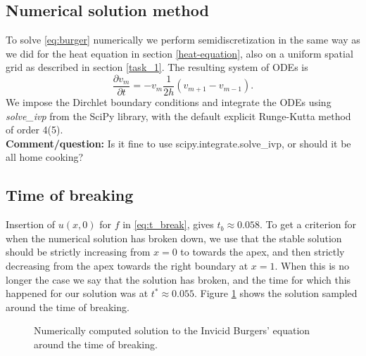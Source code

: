 \subsection*{Numerical solution method}
To solve \eqref{eq:burger} numerically we perform semidiscretization in the same way as we did for the heat equation in section \ref{heat-equation}, 
also on a uniform spatial grid as described in section \ref{task_1}. 
The resulting system of ODEs is
\begin{equation*}
    \frac{\partial v_m}{\partial t} = -v_m \frac{1}{2h} (v_{m+1} - v_{m-1}). 
\end{equation*}
We impose the Dirchlet boundary conditions and integrate the ODEs using \textit{solve\_ivp} from the SciPy library, 
with the default explicit Runge-Kutta method of order 4(5)\cite{solve_ivp}. \\
\textbf{Comment/question:} Is it fine to use scipy.integrate.solve\_ivp, 
or should it be all home cooking? 

\subsection{Time of breaking}
Insertion of $u(x, 0)$ for $f$ in \eqref{eq:t_break}, 
gives $t_b \approx 0.058$. 
To get a criterion for when the numerical solution has broken down, 
we use that the stable solution should be strictly increasing from $x=0$ to towards the apex, 
and then strictly decreasing from the apex towards the right boundary at $x=1$. 
When this is no longer the case we say that the solution has broken, 
and the time for which this happened for our solution was at $t^* \approx 0.055$. 
Figure \ref{fig:burgers-samples} shows the solution sampled around the time of breaking. 

\begin{figure}[ht]
    \centering
    
    \caption{Numerically computed solution to the Invicid Burgers' equation around the time of breaking.}
    \label{fig:burgers-samples}
\end{figure}
